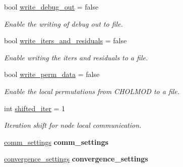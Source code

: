\begin{DoxyCompactItemize}
\mbox{\label{structschwz_1_1Settings_af81ff061a4d7220d380fb7f579d7a6e1}} 
bool \hyperlink{structschwz_1_1Settings_af81ff061a4d7220d380fb7f579d7a6e1}{write\+\_\+debug\+\_\+out} = false
\begin{DoxyCompactList}\small\item\em Enable the writing of debug out to file. \end{DoxyCompactList}\item 
\mbox{\label{structschwz_1_1Settings_a5555cf4340e7918ce22d00b26ccca6a7}} 
bool \hyperlink{structschwz_1_1Settings_a5555cf4340e7918ce22d00b26ccca6a7}{write\+\_\+iters\+\_\+and\+\_\+residuals} = false
\begin{DoxyCompactList}\small\item\em Enable writing the iters and residuals to a file. \end{DoxyCompactList}\item 
\mbox{\label{structschwz_1_1Settings_af692ca8550d16b538dcfddb5208e73f3}} 
bool \hyperlink{structschwz_1_1Settings_af692ca8550d16b538dcfddb5208e73f3}{write\+\_\+perm\+\_\+data} = false
\begin{DoxyCompactList}\small\item\em Enable the local permutations from C\+H\+O\+L\+M\+OD to a file. \end{DoxyCompactList}\item 
\mbox{\label{structschwz_1_1Settings_a33a9382f1b5961a8cb2133cb0c22daf0}} 
int \hyperlink{structschwz_1_1Settings_a33a9382f1b5961a8cb2133cb0c22daf0}{shifted\+\_\+iter} = 1
\begin{DoxyCompactList}\small\item\em Iteration shift for node local communication. \end{DoxyCompactList}\item 
\mbox{\label{structschwz_1_1Settings_a063efd688bb2442d72165d1cbb230fc6}} 
\hyperlink{structschwz_1_1Settings_1_1comm__settings}{comm\+\_\+settings} {\bfseries comm\+\_\+settings}
\item 
\mbox{\label{structschwz_1_1Settings_aba00c697bd92d6ed6332eaaf047c69a0}} 
\hyperlink{structschwz_1_1Settings_1_1convergence__settings}{convergence\+\_\+settings} {\bfseries convergence\+\_\+settings}

\end{DoxyCompactItemize}
